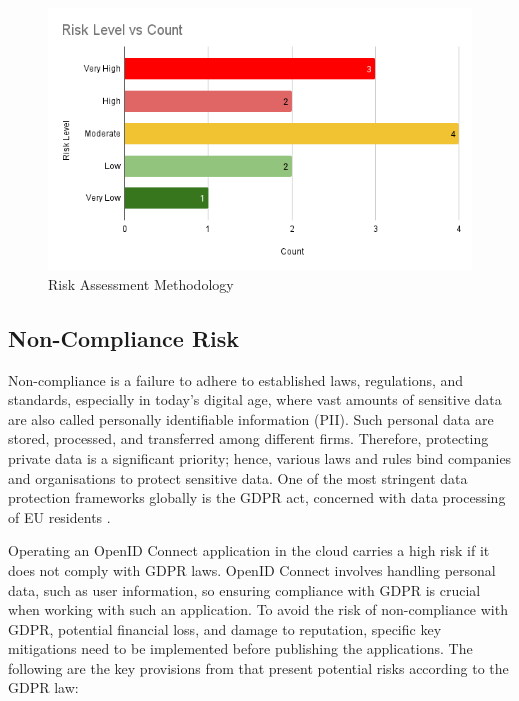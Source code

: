 \begin{figure}[h!]
\centering
\includegraphics[width=\textwidth]{pics/risk_level_vs_count.png}
\caption{Risk Assessment Methodology}\label{fig:Risk Level Counts}
\end{figure}

\subsection{Non-Compliance Risk}
Non-compliance is a failure to adhere to established laws, regulations, and standards, especially in today's digital age, where vast amounts of sensitive data are also called personally identifiable information (PII). Such personal data are stored, processed, and transferred among different firms. Therefore, protecting private data is a significant priority; hence, various laws and rules bind companies and organisations to protect sensitive data. One of the most stringent data protection frameworks globally is the GDPR act, concerned with data processing of EU residents \citep{gdpr_stringent}. 

Operating an OpenID Connect application in the cloud carries a high risk if it does not comply with GDPR laws. OpenID Connect involves handling personal data, such as user information, so ensuring compliance with GDPR is crucial when working with such an application. To avoid the risk of non-compliance with GDPR, potential financial loss, and damage to reputation, specific key mitigations need to be implemented before publishing the applications. The following are the key provisions from \citep{gdpr_law} that present potential risks according to the GDPR law:


